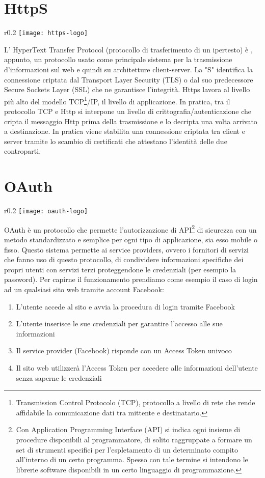 \section{HttpS}
\begin{wrapfigure}{r}{0.2\textwidth}
\texttt{[image: https-logo]}
\end{wrapfigure} 
\FloatBarrier
L' HyperText Transfer Protocol (protocollo di trasferimento di un ipertesto) è , appunto, un protocollo usato come principale sistema per la trasmissione d'informazioni sul web e quindi su architetture client-server.
La "S" identifica la connessione criptata dal Transport Layer Security (TLS) o dal suo predecessore Secure Sockets Layer (SSL) che ne garantisce l'integrità.
Https lavora al livello più alto del modello TCP\footnote{Transmission Control Protocolo (TCP), protocollo a livello di rete che  rende affidabile la comunicazione dati tra mittente e destinatario.}/IP, il livello di applicazione. In pratica, tra il protocollo TCP e Http si interpone un livello di crittografia/autenticazione che cripta il messaggio Http prima della trasmissione e lo decripta una volta arrivato a destinazione. In pratica viene stabilita una connessione criptata tra client e server tramite lo scambio di certificati che attestano l'identità delle due controparti.

\section{OAuth}
\begin{wrapfigure}{r}{0.2\textwidth}
\texttt{[image: oauth-logo]}
\end{wrapfigure} 
\FloatBarrier
OAuth è un protocollo che permette l'autorizzazione di API\footnote{Con Application Programming Interface (API) si indica ogni insieme di procedure disponibili al programmatore, di solito raggruppate a formare un set di strumenti specifici per l'espletamento di un determinato compito all'interno di un certo programma. Spesso con tale termine si intendono le librerie software disponibili in un certo linguaggio di programmazione.} di sicurezza con un metodo standardizzato e semplice per ogni tipo di applicazione, sia esso mobile o fisso. Questo sistema permette ai service providers, ovvero i fornitori di servizi che fanno uso di questo protocollo, di condividere informazioni specifiche dei propri utenti con servizi terzi proteggendone le credenziali (per esempio la password).
Per capirne il funzionamento prendiamo come esempio il caso di login ad un qualsiasi sito web tramite account Facebook:
\begin{enumerate}
\item L'utente accede al sito e avvia la procedura di login tramite Facebook
\item L'utente inserisce le sue credenziali per garantire l'accesso alle sue informazioni
\item Il service provider (Facebook) risponde con un Access Token univoco
\item Il sito web utilizzerà l'Access Token per accedere alle informazioni dell'utente senza saperne le credenziali
\end{enumerate}